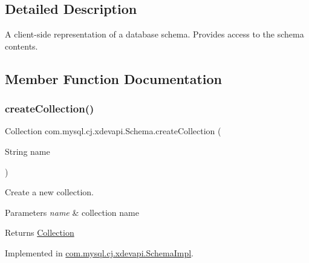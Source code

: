 \subsection{Detailed Description}
A client-\/side representation of a database schema. Provides access to the schema contents. 

\subsection{Member Function Documentation}
\mbox{\label{interfacecom_1_1mysql_1_1cj_1_1xdevapi_1_1_schema_a40a19a9c1a57c92b4197c545d21f11ea}} 
\subsubsection{\texorpdfstring{create\+Collection()}{createCollection()}\hspace{0.1cm}{\footnotesize\ttfamily [1/2]}}
{\footnotesize\ttfamily Collection com.\+mysql.\+cj.\+xdevapi.\+Schema.\+create\+Collection (\begin{DoxyParamCaption}\item[{String}]{name }\end{DoxyParamCaption})}

Create a new collection.


\begin{DoxyParams}{Parameters}
{\em name} & collection name \\
\hline
\end{DoxyParams}
\begin{DoxyReturn}{Returns}
\mbox{\hyperlink{interfacecom_1_1mysql_1_1cj_1_1xdevapi_1_1_collection}{Collection}} 
\end{DoxyReturn}


Implemented in \mbox{\hyperlink{classcom_1_1mysql_1_1cj_1_1xdevapi_1_1_schema_impl_a36cc97bce57ffb6124bc7f25ee6ed60e}{com.\+mysql.\+cj.\+xdevapi.\+Schema\+Impl}}.

\mbox{\label{interfacecom_1_1mysql_1_1cj_1_1xdevapi_1_1_schema_a81c42de36893c03f73f130ec5d7080f5}} 

